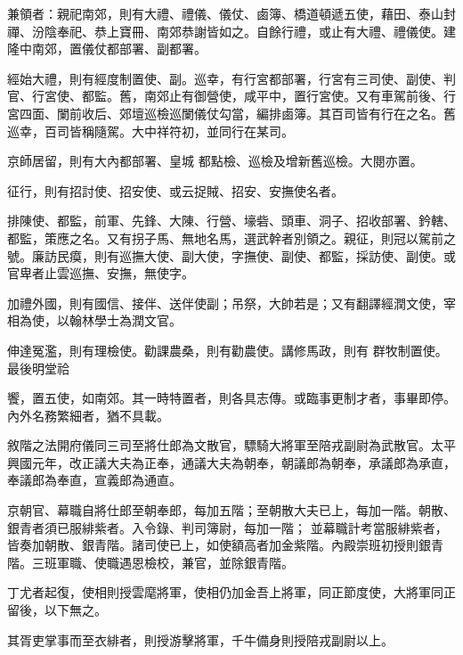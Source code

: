 \begin{pinyinscope}
 兼領者：親祀南郊，則有大禮、禮儀、儀仗、鹵簿、橋道頓遞五使，藉田、泰山封禪、汾陰奉祀、恭上寶冊、南郊恭謝皆如之。自餘行禮，或止有大禮、禮儀使。建隆中南郊，置儀仗都部署、副都署。



 經始大禮，則有經度制置使、副。巡幸，有行宮都部署，行宮有三司使、副使、判官、行宮使、都監。舊，南郊止有御營使，咸平中，置行宮使。又有車駕前後、行宮四面、闌前收后、郊壇巡檢巡闌儀仗勾當，編排鹵簿。其百司皆有行在之名。舊巡幸，百司皆稱隨駕。大中祥符初，並同行在某司。



 京師居留，則有大內都部署、皇城
 都點檢、巡檢及增新舊巡檢。大閱亦置。



 征行，則有招討使、招安使、或云捉賊、招安、安撫使名者。



 排陳使、都監，前軍、先鋒、大陳、行營、壕砦、頭車、洞子、招收部署、鈐轄、都監，策應之名。又有拐子馬、無地名馬，選武幹者別領之。親征，則冠以駕前之號。廉訪民瘼，則有巡撫大使、副大使，字撫使、副使、都監，採訪使、副使。或官卑者止雲巡撫、安撫，無使字。



 加禮外國，則有國信、接伴、送伴使副；吊祭，大帥若是；又有翻譯經潤文使，宰相為使，以翰林學士為潤文官。



 伸達冤濫，則有理檢使。勸課農桑，則有勸農使。講修馬政，則有
 群牧制置使。最後明堂祫



 饗，置五使，如南郊。其一時特置者，則各具志傳。或臨事更制才者，事畢即停。內外名務繁細者，猶不具載。



 敘階之法開府儀同三司至將仕郎為文散官，驃騎大將軍至陪戎副尉為武散官。太平興國元年，改正議大夫為正奉，通議大夫為朝奉，朝議郎為朝奉，承議郎為承直，奉議郎為奉直，宣義郎為通直。



 京朝官、幕職自將仕郎至朝奉郎，每加五階；至朝散大夫已上，每加一階。朝散、銀青者須已服緋紫者。入令錄、判司簿尉，每加一階；
 並幕職計考當服緋紫者，皆奏加朝散、銀青階。諸司使已上，如使額高者加金紫階。內殿崇班初授則銀青階。三班軍職、使職遇恩檢校，兼官，並除銀青階。



 丁尤者起復，使相則授雲麾將軍，使相仍加金吾上將軍，同正節度使，大將軍同正留後，以下無之。



 其胥吏掌事而至衣緋者，則授游擊將軍，千牛備身則授陪戎副尉以上。




\end{pinyinscope}
